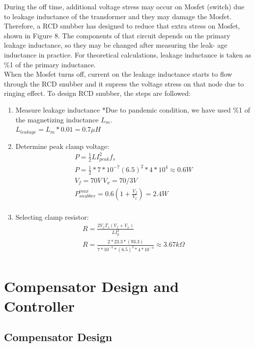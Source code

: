 \documentclass{article}
\begin{document}
During the off time, additional voltage stress may occur on Mosfet (switch) due to leakage inductance of the
transformer and they may damage the Mosfet. Therefore, a RCD snubber has designed to reduce that extra stress on Mosfet, shown in Figure 8. The components of that circuit depends on the primary leakage inductance, so they may be changed after measuring the leak-
age inductance in practice. For theoretical calculations, leakage inductance is
taken as \%1 of the primary inductance.\\
When the Mosfet turns off, current on the leakage inductance starts to flow through the RCD snubber and it supress the voltage stress on that node due to ringing effect. To design RCD snubber, the steps are followed:
\begin{enumerate}
    \item Measure leakage inductance
    *Due to pandemic condition, we have used \%1 of the magnetizing inductance $L_m$.\\
    $L_{leakage}=L_m*0.01=0.7\mu H$\\
    \item Determine peak clamp voltage:
    \begin{gather*}
        P=\frac{1}{2}LI_{peak}^2f_s\\
        P=\frac{1}{2}*7*10^{-7}(6.5)^2*4*10^4\approx 0.6W\\
        V_f=70V \: V_x=70/3V\\
        P_{snubber}^{max}=0.6(1+\frac{V_f}{V_x})=2.4W\\
    \end{gather*}
    \item Selecting clamp resistor:
    \begin{gather*}
     R=\frac{2V_xT_s(V_f+V_x)}{LI_p^2}\\
    R=\frac{2*23.3*(93.3)}{7*10^{-7}*(6.5)^2*4*10^{-4}}\approx3.67k\Omega\\
    \end{gather*}
\end{enumerate}




\section{Compensator Design and Controller}
\subsection{Compensator Design}
\end{document}
